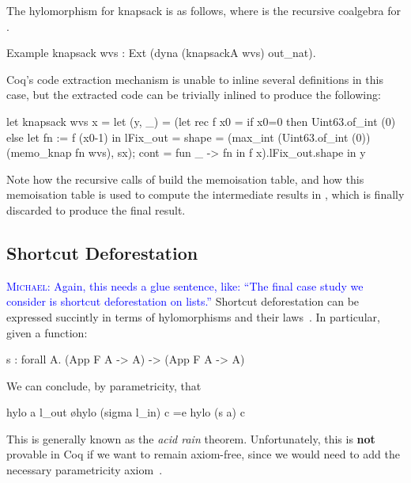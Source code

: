 \documentclass[ a4paper, UKenglish, cleveref, autoref, thm-restate]{lipics-v2021}
\newcommand{\mvol}[1]{\textcolor{blue}{\textsc{Michael}: #1}}
\begin{document}
The hylomorphism for knapsack is as follows, where  is the
recursive coalgebra for .
\begin{coqcode}
Example knapsack wvs : Ext (dyna (knapsackA wvs) out_nat).
\end{coqcode}
Coq's code extraction mechanism is unable to inline several definitions in
this case, but the extracted code can be trivially inlined to produce the
following:
\begin{ocamlcode}
let knapsack wvs x =
  let (y, _) =
    (let rec f x0 =
      if x0=0 then Uint63.of_int (0)
      else let fn := f (x0-1) in { lFix_out = { 
           shape = (max_int (Uint63.of_int (0)) (memo_knap fn wvs), sx);
           cont = fun _ -> fn } }
     in f x).lFix_out.shape
  in y
\end{ocamlcode}
Note how the recursive calls of  build the memoisation table, and how
this memoisation table is used to compute the intermediate results in
, which is finally discarded to produce the final result.

\subsection{Shortcut Deforestation}
\mvol{Again, this needs a glue sentence, like: ``The final case study we consider is shortcut deforestation on lists.''}
Shortcut deforestation can be expressed succintly in terms of hylomorphisms and
their laws~\cite{TakanoM95}. In particular, given a function:
\begin{coqcode}
  s  : forall A. (App F A -> A) -> (App F A -> A)
\end{coqcode}
We can conclude, by parametricity, that
\begin{coqcode}
  hylo a l_out \o hylo (sigma l_in) c =e hylo (s a) c
\end{coqcode}
This is generally known as the \emph{acid rain} theorem. Unfortunately, this is
\textbf{not} provable in Coq if we want to remain axiom-free, since we would
need to add the necessary parametricity
axiom~\cite{keller_et_al:LIPIcs.CSL.2012.381}.
\end{document}
